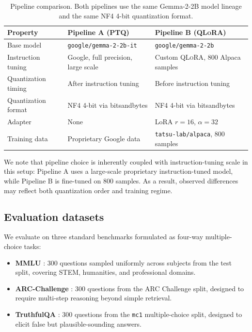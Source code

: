 \documentclass[10pt]{article}
\newcommand{\ptq}{\textsc{PTQ}}
\newcommand{\qlora}{\textsc{QLoRA}}
\begin{document}
\begin{table}[t]
\caption{Pipeline comparison. Both pipelines use the same Gemma-2-2B model lineage and the same NF4 4-bit quantization format.}
\label{tab:pipeline-comparison}
\begin{center}
\begin{tabular}{lll}
\toprule
Property & Pipeline A (\ptq) & Pipeline B (\qlora) \\
\midrule
Base model & \texttt{google/gemma-2-2b-it} & \texttt{google/gemma-2-2b} \\
Instruction tuning & Google, full precision, large scale & Custom \qlora, 800 Alpaca samples \\
Quantization timing & After instruction tuning & Before instruction tuning \\
Quantization format & NF4 4-bit via bitsandbytes & NF4 4-bit via bitsandbytes \\
Adapter & None & LoRA $r=16$, $\alpha=32$ \\
Training data & Proprietary Google data & \texttt{tatsu-lab/alpaca}, 800 samples \\
\bottomrule
\end{tabular}
\end{center}
\end{table}

We note that pipeline choice is inherently coupled with instruction-tuning scale in this setup: Pipeline A uses a large-scale proprietary instruction-tuned model, while Pipeline B is fine-tuned on 800 samples. As a result, observed differences may reflect both quantization order and training regime.

\subsection{Evaluation datasets}

We evaluate on three standard benchmarks formulated as four-way multiple-choice tasks:
\begin{itemize}
    \item \textbf{MMLU} \citep{hendrycks2021mmlu}: 300 questions sampled uniformly across subjects from the test split, covering STEM, humanities, and professional domains.
    \item \textbf{ARC-Challenge} \citep{clark2018arc}: 300 questions from the ARC Challenge split, designed to require multi-step reasoning beyond simple retrieval.
    \item \textbf{TruthfulQA} \citep{lin2022truthfulqa}: 300 questions from the \texttt{mc1} multiple-choice split, designed to elicit false but plausible-sounding answers.
\end{itemize}
\end{document}

